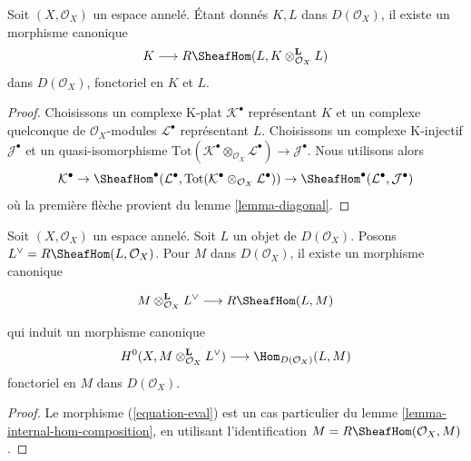 {\begin{lemma}

\label{lemma-internal-hom-diagonal}
Soit $(X, \mathcal{O}_X)$ un espace annelé. Étant donnés $K, L$ dans $D(\mathcal{O}_X)$, il existe un morphisme canonique $$
K \longrightarrow R\SheafHom(L, K \otimes_{\mathcal{O}_X}^\mathbf{L} L)
$$ dans $D(\mathcal{O}_X)$, fonctoriel en $K$ et $L$.
\end{lemma}

\begin{proof}
Choisissons un complexe K-plat $\mathcal{K}^\bullet$ représentant $K$ et un complexe quelconque de $\mathcal{O}_X$-modules $\mathcal{L}^\bullet$ représentant $L$. Choisissons un complexe K-injectif $\mathcal{J}^\bullet$ et un quasi-isomorphisme $\text{Tot}(\mathcal{K}^\bullet \otimes_{\mathcal{O}_X} \mathcal{L}^\bullet)
\to \mathcal{J}^\bullet$. Nous utilisons alors $$
\mathcal{K}^\bullet \to
\SheafHom^\bullet(\mathcal{L}^\bullet,
\text{Tot}(\mathcal{K}^\bullet \otimes_{\mathcal{O}_X} \mathcal{L}^\bullet))
\to
\SheafHom^\bullet(\mathcal{L}^\bullet, \mathcal{J}^\bullet)
$$ où la première flèche provient du lemme \ref{lemma-diagonal}.
\end{proof}

\begin{lemma}

\label{lemma-dual}

Soit $(X, \mathcal{O}_X)$ un espace annelé. Soit $L$ un objet de $D(\mathcal{O}_X)$. Posons $L^\vee = R\SheafHom(L, \mathcal{O}_X)$. Pour $M$ dans $D(\mathcal{O}_X)$, il existe un morphisme canonique

\begin{equation}
\label{equation-eval}
M \otimes^\mathbf{L}_{\mathcal{O}_X} L^\vee
\longrightarrow
R\SheafHom(L, M)
\end{equation}

qui induit un morphisme canonique
$$
H^0(X, M \otimes^\mathbf{L}_{\mathcal{O}_X} L^\vee)
\longrightarrow
\Hom_{D(\mathcal{O}_X)}(L, M)
$$
fonctoriel en $M$ dans $D(\mathcal{O}_X)$.

\end{lemma}

\begin{proof}
Le morphisme (\ref{equation-eval}) est un cas particulier du lemme \ref{lemma-internal-hom-composition}, en utilisant l'identification $M = R\SheafHom(\mathcal{O}_X, M)$.
\end{proof}

\begin{lemma}


\end{lemma}}
